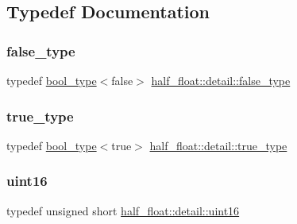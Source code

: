 \subsection{Typedef Documentation}
\mbox{\label{namespacehalf__float_1_1detail_a04d0449ab22bc6d1cfb2f31a8271945c}} 
\subsubsection{\texorpdfstring{false\+\_\+type}{false\_type}}
{\footnotesize\ttfamily typedef \hyperlink{structhalf__float_1_1detail_1_1bool__type}{bool\+\_\+type}$<$false$>$ \hyperlink{namespacehalf__float_1_1detail_a04d0449ab22bc6d1cfb2f31a8271945c}{half\+\_\+float\+::detail\+::false\+\_\+type}}

\mbox{\label{namespacehalf__float_1_1detail_a5e245748a3cc20e348dd92383d99d03c}} 
\subsubsection{\texorpdfstring{true\+\_\+type}{true\_type}}
{\footnotesize\ttfamily typedef \hyperlink{structhalf__float_1_1detail_1_1bool__type}{bool\+\_\+type}$<$true$>$ \hyperlink{namespacehalf__float_1_1detail_a5e245748a3cc20e348dd92383d99d03c}{half\+\_\+float\+::detail\+::true\+\_\+type}}

\mbox{\label{namespacehalf__float_1_1detail_a239ec58092b4e4849b444baee1a01088}} 
\subsubsection{\texorpdfstring{uint16}{uint16}}
{\footnotesize\ttfamily typedef unsigned short \hyperlink{namespacehalf__float_1_1detail_a239ec58092b4e4849b444baee1a01088}{half\+\_\+float\+::detail\+::uint16}}



